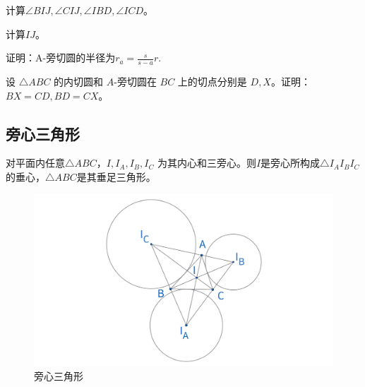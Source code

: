 \begin{exercise}
    计算$\angle BIJ, \angle CIJ, \angle IBD, \angle ICD$。
\end{exercise}
\begin{exercise}
    计算$IJ$。
\end{exercise}
\begin{exercise}[旁切圆半径]
    证明：A-旁切圆的半径为$r_a = \frac{s}{s-a}r.$
\end{exercise}


\begin{exercise}
    设 $\triangle ABC$ 的内切圆和 $A$-旁切圆在 $BC$ 上的切点分别是 $D, X$。证明：$BX = CD, BD = CX$。
\end{exercise}



\newpage 
\subsection{旁心三角形}
\begin{proposition}[旁心三角形]
    对平面内任意$\triangle ABC$，$I, I_A,I_B,I_C$ 为其内心和三旁心。则$I$是旁心所构成$\triangle I_AI_BI_C$ 的垂心，$\triangle ABC$是其垂足三角形。
\end{proposition}

\begin{figure}[H]
    \centering
    \includegraphics[width=\linewidth]{figures/三角形五心/旁心三角形.png}
    \caption{旁心三角形}
\end{figure}




